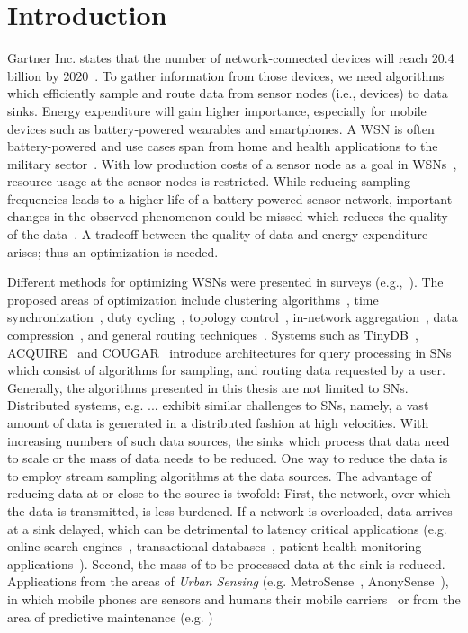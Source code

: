 \section{Introduction}
\label{sec:Introduction}
Gartner Inc. states that the number of network-connected devices will reach
20.4 billion by 2020~\cite{gartner}. To gather information from those devices,
we need algorithms which efficiently sample and route data from sensor nodes
(i.e., devices) to data sinks. Energy expenditure will gain higher importance,
especially for mobile devices such as battery-powered wearables and
smartphones. A \ac{WSN} is often battery-powered and use cases span from home
and health applications to the military sector~\cite{akyildiz2002wireless}.
With low production costs of a sensor node as a goal in
\acp{WSN}~\cite{akyildiz2002wireless}, resource usage at the sensor nodes is
restricted. While reducing sampling frequencies leads to a higher life of a
battery-powered sensor network, important changes in the observed phenomenon
could be missed which reduces the quality of the
data~\cite{akyildiz2002wireless}. A tradeoff between the quality of data and
energy expenditure arises; thus an optimization is needed. 
\par
Different methods for optimizing \acp{WSN} were presented in surveys
(e.g.,~\cite{abbasi2007survey, sivrikaya2004time, carrano2014survey}). The
proposed areas of optimization include clustering
algorithms~\cite{abbasi2007survey}, time
synchronization~\cite{sivrikaya2004time}, duty
cycling~\cite{carrano2014survey}, topology control~\cite{li2013survey},
in-network aggregation~\cite{fasolo2007network}, data
compression~\cite{srisooksai2012practical}, and general routing
techniques~\cite{al2004routing, kulkarni2011particle, singh2015survey,
rault2014energy}. Systems such as TinyDB~\cite{madden2005tinydb},
ACQUIRE~\cite{sadagopan2003acquire} and COUGAR~\cite{yao2002cougar} introduce
architectures for query processing in \acp{SN} which consist of algorithms for
sampling, and routing data requested by a user. Generally, the algorithms
presented in this thesis are not limited to \acp{SN}. Distributed systems, e.g.
... exhibit similar challenges to \acp{SN}, namely, a vast amount of data is
generated in a distributed fashion at high velocities. With increasing numbers
of such data sources, the sinks which process that data need to scale or the
mass of data needs to be reduced. One way to reduce the data is to employ
stream sampling algorithms at the data sources. The advantage of reducing data
at or close to the source is twofold: First, the network, over which the data
is transmitted, is less burdened. If a network is overloaded, data arrives at a
sink delayed, which can be detrimental to latency critical applications (e.g.
online search engines~\cite{kasture2016tailbench}, transactional
databases~\cite{kasture2016tailbench}, patient health monitoring
applications~\cite{abdullah2015real}). Second, the mass of to-be-processed data
at the sink is reduced. Applications from the areas of \textit{Urban Sensing}
(e.g. MetroSense~\cite{campbell2006people},
AnonySense~\cite{cornelius2008anonysense}), in which mobile phones are sensors
and humans their mobile carriers~\cite{calabrese2015urban, shin2009deamon} or
from the area of predictive maintenance (e.g. )

